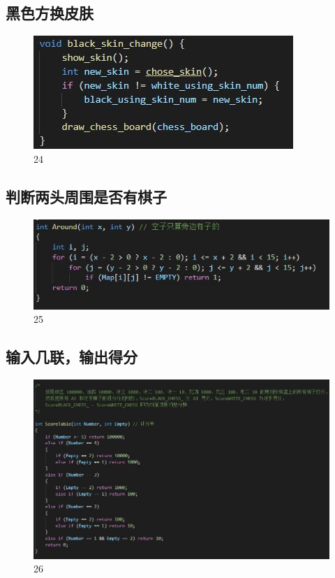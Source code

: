 \documentclass[UTF8]{ctexart}
\begin{document}
\subsection{黑色方换皮肤}
\begin{figure}[H]
    \centering
    \includegraphics[scale=1.0]{23.jpg}
\caption{24}
\end{figure}
\subsection{判断两头周围是否有棋子}
\begin{figure}[H]
    \centering
    \includegraphics[scale=1.0]{24.jpg}
\caption{25}
\end{figure}
\subsection{输入几联，输出得分}
\begin{figure}[H]
    \centering
    \includegraphics[scale=0.7]{25.jpg}
\caption{26}
\end{figure}
\end{document}
